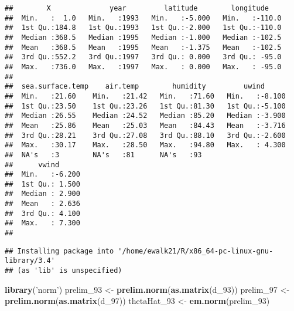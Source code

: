 \documentclass[]{article}
\newenvironment{Shaded}{\begin{snugshade}}{\end{snugshade}}
\newcommand{\KeywordTok}[1]{\textcolor[rgb]{0.13,0.29,0.53}{\textbf{#1}}}
\newcommand{\DecValTok}[1]{\textcolor[rgb]{0.00,0.00,0.81}{#1}}
\newcommand{\StringTok}[1]{\textcolor[rgb]{0.31,0.60,0.02}{#1}}
\newcommand{\OperatorTok}[1]{\textcolor[rgb]{0.81,0.36,0.00}{\textbf{#1}}}
\newcommand{\NormalTok}[1]{#1}
\begin{document}
\begin{verbatim}
##        X              year         latitude        longitude     
##  Min.   :  1.0   Min.   :1993   Min.   :-5.000   Min.   :-110.0  
##  1st Qu.:184.8   1st Qu.:1993   1st Qu.:-2.000   1st Qu.:-110.0  
##  Median :368.5   Median :1995   Median :-1.000   Median :-102.5  
##  Mean   :368.5   Mean   :1995   Mean   :-1.375   Mean   :-102.5  
##  3rd Qu.:552.2   3rd Qu.:1997   3rd Qu.: 0.000   3rd Qu.: -95.0  
##  Max.   :736.0   Max.   :1997   Max.   : 0.000   Max.   : -95.0  
##                                                                  
##  sea.surface.temp    air.temp        humidity         uwind       
##  Min.   :21.60    Min.   :21.42   Min.   :71.60   Min.   :-8.100  
##  1st Qu.:23.50    1st Qu.:23.26   1st Qu.:81.30   1st Qu.:-5.100  
##  Median :26.55    Median :24.52   Median :85.20   Median :-3.900  
##  Mean   :25.86    Mean   :25.03   Mean   :84.43   Mean   :-3.716  
##  3rd Qu.:28.21    3rd Qu.:27.08   3rd Qu.:88.10   3rd Qu.:-2.600  
##  Max.   :30.17    Max.   :28.50   Max.   :94.80   Max.   : 4.300  
##  NA's   :3        NA's   :81      NA's   :93                      
##      vwind       
##  Min.   :-6.200  
##  1st Qu.: 1.500  
##  Median : 2.900  
##  Mean   : 2.636  
##  3rd Qu.: 4.100  
##  Max.   : 7.300  
## 
\end{verbatim}

\begin{Shaded}
\end{Shaded}

\begin{verbatim}
## Installing package into '/home/ewalk21/R/x86_64-pc-linux-gnu-library/3.4'
## (as 'lib' is unspecified)
\end{verbatim}

\begin{Shaded}
\begin{Highlighting}[]
\KeywordTok{library}\NormalTok{(}\StringTok{'norm'}\NormalTok{)}
\NormalTok{prelim_}\DecValTok{93}\NormalTok{ <-}\StringTok{ }\KeywordTok{prelim.norm}\NormalTok{(}\KeywordTok{as.matrix}\NormalTok{(d_}\DecValTok{93}\NormalTok{))}
\NormalTok{prelim_}\DecValTok{97}\NormalTok{ <-}\StringTok{ }\KeywordTok{prelim.norm}\NormalTok{(}\KeywordTok{as.matrix}\NormalTok{(d_}\DecValTok{97}\NormalTok{))}
\NormalTok{thetaHat_}\DecValTok{93}\NormalTok{ <-}\StringTok{ }\KeywordTok{em.norm}\NormalTok{(prelim_}\DecValTok{93}\NormalTok{)}
\end{Highlighting}
\end{Shaded}
\end{document}
